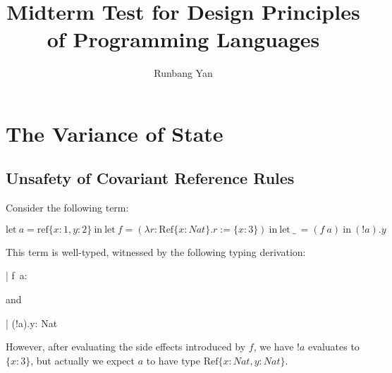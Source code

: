 \documentclass[manuscript]{acmart}
\begin{document}
\title{Midterm Test for Design Principles of Programming Languages}

\author{Runbang Yan}

\renewcommand{\shortauthors}{Yan}

\maketitle

\section{The Variance of State}
\subsection{Unsafety of Covariant Reference Rules}
Consider the following term:

$$
\text{let}\ a = \text{ref} \{x: 1, y: 2\}\ \text{in}\ 
\text{let}\ f = (\lambda r: \text{Ref}\{x: Nat\}. r := \{x: 3\})\ \text{in}\ \text{let}\ \_\ =(f\ a)\ \text{in}\ (!a).y
$$

This term is well-typed, witnessed by the following typing derivation:

\begin{mathpar}

    { \Gamma | \Sigma \vdash f\ a:  }

\end{mathpar}
and

\begin{mathpar}

    {\Gamma | \Sigma \vdash (!a).y: Nat}
    

\end{mathpar}

However, after evaluating the side effects introduced by $f$, we have $!a$ evaluates to $\{x: 3\}$, but actually we expect $a$ to have type $\text{Ref}\{x: Nat, y: Nat\}$.
\end{document}
